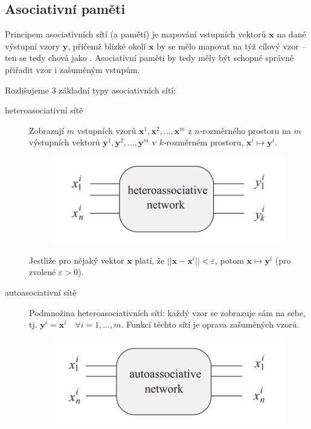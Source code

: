\documentclass[11pt]{report} %
\renewcommand{\vec}[1]{\mathbf{#1}}
\numberwithin{equation}{section}
\begin{document}
\subsection{Asociativní paměti}

Principem asociativních sítí (a pamětí) je mapování vstupních vektorů $\vec{x}$ na dané výstupní vzory $\vec{y}$, přičemž blízké okolí $\vec{x}$ by se mělo mapovat na týž cílový vzor -- ten se tedy chová jako . Asociativní paměti by tedy měly být schopné správně přiřadit vzor i zašuměným vstupům. 

Rozlišujeme 3 základní typy asociativních sítí:

\begin{description}
	
	
	\item[heteroasociativní sítě] Zobrazují $m$ vstupních vzorů $\vec{x}^1, \vec{x}^2, \dots, \vec{x}^m$ z $n$-rozměrného prostoru na $m$ výstupních vektorů $\vec{y}^1, \vec{y}^2, \dots, \vec{y}^m$ v $k$-rozměrném prostoru, $\vec{x}^i \mapsto \vec{y}^i$. 
	\begin{figure}[H]
		\centering
		\includegraphics[scale=1]{img/nn_asoc_hetero}
	\end{figure}
	
	Jestliže pro nějaký vektor $\vec{x}$ platí, že $||\vec{x} - \vec{x}^i|| < \varepsilon$, potom $\vec{x} \mapsto \vec{y}^i$ (pro zvolené $\varepsilon > 0$).
	
	\item[autoasociativní sítě] Podmnožina heteroasociativních sítí: každý vzor se zobrazuje 
	sám na sebe, tj. $\vec{y}^i = \vec{x}^i \quad \forall i = 1, \dots, m$. Funkcí těchto sítí je oprava zašuměných vzorů.
	\begin{figure}[H]
		\centering
		\includegraphics[scale=1]{img/nn_asoc_auto}
	\end{figure}
	

\end{description}
\end{document}
